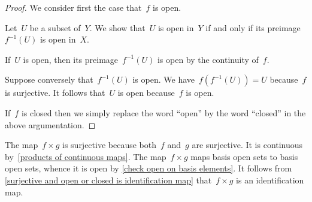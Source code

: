 \begin{proof}
	We consider first the case that~$f$ is open.

	Let~$U$ be a subset of~$Y$.
	We show that~$U$ is open in~$Y$ if and only if its preimage~$f^{-1}(U)$ is open in~$X$.

	If~$U$ is open, then its preimage~$f^{-1}(U)$ is open by the continuity of~$f$.

	Suppose conversely that~$f^{-1}(U)$ is open.
	We have~$f(f^{-1}(U)) = U$ because~$f$ is surjective.
	It follows that~$U$ is open because~$f$ is open.

	If~$f$ is closed then we simply replace the word \enquote{open} by the word \enquote{closed} in the above argumentation.
\end{proof}

The map~$f × g$ is surjective because both~$f$ and~$g$ are surjective.
It is continuous by~\cref{products of continuous maps}.
The map~$f × g$ maps basis open sets to basis open sets, whence it is open by \cref{check open on basis elements}.
It follows from \cref{surjective and open or closed is identification map} that~$f × g$ is an identification map.
